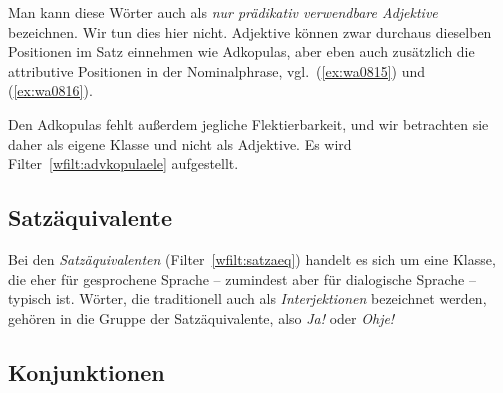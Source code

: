 Man kann diese Wörter auch als \textit{nur prädikativ verwendbare Adjektive} bezeichnen.
Wir tun dies hier nicht.
Adjektive können zwar durchaus dieselben Positionen im Satz einnehmen wie Adkopulas, aber eben auch zusätzlich die attributive Positionen in der Nominalphrase, vgl.\ (\ref{ex:wa0815}) und (\ref{ex:wa0816}).

\begin{exe}
  \ex\label{ex:wa0815}
  \begin{xlist}
  \end{xlist}
  \ex\label{ex:wa0816}
  \begin{xlist}
  \end{xlist}
\end{exe}

Den Adkopulas fehlt außerdem jegliche Flektierbarkeit, und wir betrachten sie daher als eigene Klasse und nicht als Adjektive.
Es wird Filter~\ref{wfilt:advkopulaele} aufgestellt.


\subsection{Satzäquivalente}

\label{sec:satzaequivalentewortklassen}


Bei den \textit{Satzäquivalenten} (Filter~\ref{wfilt:satzaeq}) handelt es sich um eine Klasse, die eher für gesprochene Sprache -- zumindest aber für dialogische Sprache -- typisch ist.
Wörter, die traditionell auch als \textit{Interjektionen} bezeichnet werden, gehören in die Gruppe der Satzäquivalente, also \textit{Ja!} oder \textit{Ohje!}


\subsection{Konjunktionen}

\label{sec:konjunktionenwortklassen}

